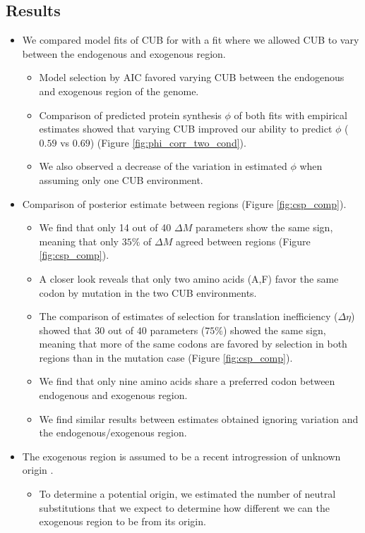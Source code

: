 \documentclass[12pt]{article}
\begin{document}
\subsection*{Results}

\begin{itemize}
	\item We compared model fits of CUB for \kluyveri with a fit where we allowed CUB to vary between the endogenous and exogenous region.
	\begin{itemize}
		\item Model selection by AIC favored varying CUB between the endogenous and exogenous region of the \kluyveri genome.
		\item Comparison of predicted protein synthesis $\phi$ of both fits with empirical estimates showed that varying CUB improved our ability to predict $\phi$ ($0.59$ vs $0.69$) (Figure \ref{fig:phi_corr_two_cond}).
		\item We also observed a decrease of the variation in estimated $\phi$ when assuming only one CUB environment.
	\end{itemize}
	\item Comparison of posterior estimate between regions (Figure  \ref{fig:csp_comp}).
	\begin{itemize}
		\item We find that only 14 out of 40 $\Delta M$ parameters show the same sign, meaning that only $35 \%$ of $\Delta M$ agreed between regions (Figure \ref{fig:csp_comp}). 
		\item A closer look reveals that only two amino acids (A,F) favor the same codon by mutation in the two CUB environments.
		\item The comparison of estimates of selection for translation inefficiency ($\Delta \eta$) showed that $30$ out of $40$ parameters ($75 \%$) showed the same sign, meaning that more of the same codons are favored by selection in both regions than in the mutation case (Figure \ref{fig:csp_comp}).
		\item We find that only nine amino acids share a preferred codon between endogenous and exogenous region.
		\item We find similar results between estimates obtained ignoring variation and the endogenous/exogenous region.
	\end{itemize}
	\item The exogenous region is assumed to be a recent introgression of unknown origin \citep{friedrich2015}.
	\begin{itemize}
		\item To determine a potential origin, we estimated the number of neutral substitutions that we expect to determine how different we can the exogenous region to be from its origin.

\end{itemize}
\end{itemize}
\end{document}
